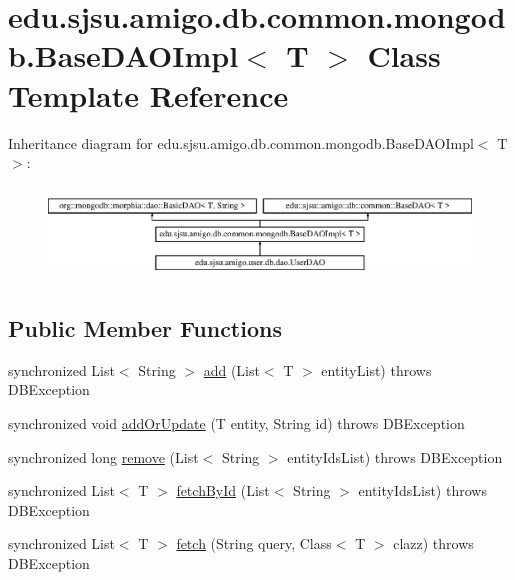 \hypertarget{classedu_1_1sjsu_1_1amigo_1_1db_1_1common_1_1mongodb_1_1_base_d_a_o_impl}{}\section{edu.\+sjsu.\+amigo.\+db.\+common.\+mongodb.\+Base\+D\+A\+O\+Impl$<$ T $>$ Class Template Reference}
\label{classedu_1_1sjsu_1_1amigo_1_1db_1_1common_1_1mongodb_1_1_base_d_a_o_impl}
Inheritance diagram for edu.\+sjsu.\+amigo.\+db.\+common.\+mongodb.\+Base\+D\+A\+O\+Impl$<$ T $>$\+:\begin{figure}[H]
\begin{center}
\leavevmode
\includegraphics[height=2.470588cm]{classedu_1_1sjsu_1_1amigo_1_1db_1_1common_1_1mongodb_1_1_base_d_a_o_impl}
\end{center}
\end{figure}
\subsection*{Public Member Functions}
\begin{DoxyCompactItemize}
\item 
synchronized List$<$ String $>$ \hyperlink{classedu_1_1sjsu_1_1amigo_1_1db_1_1common_1_1mongodb_1_1_base_d_a_o_impl_aa9f9296750acb9a6f356163e35157837}{add} (List$<$ T $>$ entity\+List)  throws D\+B\+Exception 
\item 
synchronized void \hyperlink{classedu_1_1sjsu_1_1amigo_1_1db_1_1common_1_1mongodb_1_1_base_d_a_o_impl_af9d483046160700cea18a20a7817cd3a}{add\+Or\+Update} (T entity, String id)  throws D\+B\+Exception 
\item 
synchronized long \hyperlink{classedu_1_1sjsu_1_1amigo_1_1db_1_1common_1_1mongodb_1_1_base_d_a_o_impl_ac8ca9075d687d809293f54749f92c7e9}{remove} (List$<$ String $>$ entity\+Ids\+List)  throws D\+B\+Exception 
\item 
synchronized List$<$ T $>$ \hyperlink{classedu_1_1sjsu_1_1amigo_1_1db_1_1common_1_1mongodb_1_1_base_d_a_o_impl_a0f44ed7ba8e92fa387be39194177e4cf}{fetch\+By\+Id} (List$<$ String $>$ entity\+Ids\+List)  throws D\+B\+Exception 
\item 
synchronized List$<$ T $>$ \hyperlink{classedu_1_1sjsu_1_1amigo_1_1db_1_1common_1_1mongodb_1_1_base_d_a_o_impl_a81fcb51cfb42fd2417df430a5a0eff8f}{fetch} (String query, Class$<$ T $>$ clazz)  throws D\+B\+Exception 
\end{DoxyCompactItemize}
